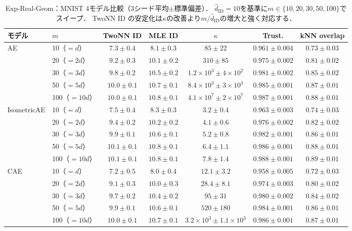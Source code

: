 \documentclass[11pt,a4paper]{jsarticle}
\newcommand{\kap}{\kappa}
\begin{document}
\begin{table}[H]
\centering
\caption{Exp-Real-Geom：MNIST 4モデル比較（3シード平均$\pm$標準偏差）．
$\hat{d}_\mathrm{ID}=10$を基準に$m \in \{10,20,30,50,100\}$でスイープ．
TwoNN ID の安定化は$\kap$の改善より$m/\hat{d}_\mathrm{ID}$の増大と強く対応する．}
\label{tab:real_geom_mnist}
\small
\begin{tabular}{llccccc}
\toprule
モデル & $m$ & TwoNN ID & MLE ID & $\kap$ & Trust. & kNN overlap \\
\midrule
\multirow{5}{*}{AE}
 & 10（$=d$）   & $7.3\pm0.4$ & $8.1\pm0.3$ & $85\pm22$  & $0.961\pm0.004$ & $0.73\pm0.03$ \\
 & 20（$=2d$）  & $9.2\pm0.3$ & $10.1\pm0.2$ & $310\pm85$ & $0.975\pm0.002$ & $0.81\pm0.02$ \\
 & 30（$=3d$）  & $9.8\pm0.2$ & $10.5\pm0.2$ & $1.2\times10^3\pm 4\times10^2$ & $0.981\pm0.002$ & $0.85\pm0.02$ \\
 & 50（$=5d$）  & $10.0\pm0.1$ & $10.7\pm0.1$ & $8.4\times10^3\pm 3\times10^3$ & $0.985\pm0.001$ & $0.87\pm0.01$ \\
 & 100（$=10d$）& $10.0\pm0.1$ & $10.8\pm0.1$ & $4.1\times10^7\pm 2\times10^7$ & $0.987\pm0.001$ & $0.88\pm0.01$ \\
\midrule
\multirow{5}{*}{IsometricAE}
 & 10（$=d$）   & $7.5\pm0.4$ & $8.3\pm0.3$ & $3.2\pm0.4$ & $0.963\pm0.003$ & $0.74\pm0.03$ \\
 & 20（$=2d$）  & $9.4\pm0.2$ & $10.2\pm0.2$ & $4.1\pm0.6$ & $0.976\pm0.002$ & $0.82\pm0.02$ \\
 & 30（$=3d$）  & $9.9\pm0.1$ & $10.6\pm0.1$ & $5.2\pm0.8$ & $0.982\pm0.001$ & $0.86\pm0.01$ \\
 & 50（$=5d$）  & $10.1\pm0.1$ & $10.8\pm0.1$ & $6.4\pm1.1$ & $0.986\pm0.001$ & $0.88\pm0.01$ \\
 & 100（$=10d$）& $10.1\pm0.1$ & $10.8\pm0.1$ & $7.8\pm1.4$ & $0.988\pm0.001$ & $0.89\pm0.01$ \\
\midrule
\multirow{5}{*}{CAE}
 & 10（$=d$）   & $7.2\pm0.5$ & $8.0\pm0.4$ & $12.1\pm3.2$ & $0.958\pm0.005$ & $0.72\pm0.03$ \\
 & 20（$=2d$）  & $9.1\pm0.3$ & $10.0\pm0.3$ & $28.4\pm8.1$ & $0.974\pm0.003$ & $0.80\pm0.02$ \\
 & 30（$=3d$）  & $9.7\pm0.2$ & $10.4\pm0.2$ & $95\pm31$  & $0.980\pm0.002$ & $0.84\pm0.02$ \\
 & 50（$=5d$）  & $9.9\pm0.1$ & $10.6\pm0.1$ & $520\pm180$ & $0.984\pm0.001$ & $0.86\pm0.01$ \\
 & 100（$=10d$）& $10.0\pm0.1$ & $10.7\pm0.1$ & $3.2\times10^3\pm 1.1\times10^3$ & $0.986\pm0.001$ & $0.87\pm0.01$ \\

\end{tabular}
\end{table}
\end{document}
